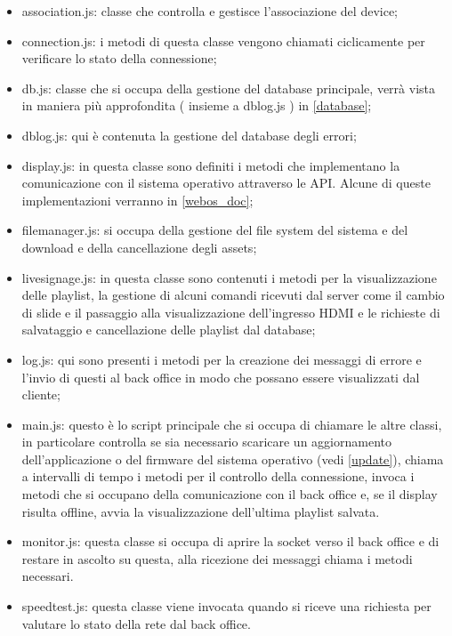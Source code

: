 \begin{itemize}
    \item association.js: classe che controlla e gestisce l'associazione del device;
    \item connection.js: i metodi di questa classe vengono chiamati ciclicamente per verificare lo stato della connessione;
    \item db.js: classe che si occupa della gestione del database principale, verrà vista in maniera più approfondita ( insieme a dblog.js ) in \ref*{database};
    \item dblog.js: qui è contenuta la gestione del database degli errori;
    \item display.js: in questa classe sono definiti i metodi che implementano la comunicazione con il sistema operativo attraverso le API. Alcune di queste implementazioni verranno  in \ref*{webos_doc};
    \item filemanager.js: si occupa della gestione del file system del sistema e del download e della cancellazione degli assets;
    \item livesignage.js: in questa classe sono contenuti i metodi per la visualizzazione delle playlist, la gestione di alcuni comandi ricevuti dal server come il cambio di slide e il passaggio alla visualizzazione dell'ingresso HDMI e le richieste di salvataggio e cancellazione delle playlist dal database;
    \item log.js: qui sono presenti i metodi per la creazione dei messaggi di errore e l'invio di questi al back office in modo che possano essere visualizzati dal cliente;
    \item main.js: questo è lo script principale che si occupa di chiamare le altre classi, in particolare controlla se sia necessario scaricare un aggiornamento dell'applicazione o del firmware del sistema operativo (vedi \ref*{update}), chiama a intervalli di tempo i metodi per il controllo della connessione, invoca i metodi che si occupano della comunicazione con il back office e, se il display risulta offline, avvia la visualizzazione dell'ultima playlist salvata.
    \item monitor.js: questa classe si occupa di aprire la socket verso il back office e di restare in ascolto su questa, alla ricezione dei messaggi chiama i metodi necessari.
    \item speedtest.js: questa classe viene invocata quando si riceve una richiesta per valutare lo stato della rete dal back office.
\end{itemize}

